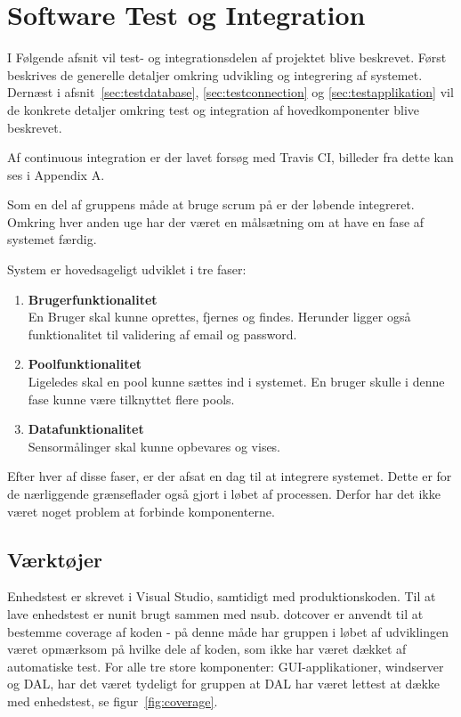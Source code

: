 \chapter{Software Test og Integration}

I Følgende afsnit vil test- og integrationsdelen af projektet blive beskrevet. Først beskrives de generelle detaljer omkring udvikling og integrering af systemet. 
Dernæst i afsnit~\ref{sec:testdatabase}, \ref{sec:testconnection} og \ref{sec:testapplikation} vil de konkrete detaljer omkring test og integration af hovedkomponenter blive beskrevet.

Af continuous integration er der lavet forsøg med Travis CI, billeder fra dette kan ses i Appendix A.

Som en del af gruppens måde at bruge scrum på er der løbende integreret. Omkring hver anden uge har der været en målsætning om at have en fase af systemet færdig. 

System er hovedsageligt udviklet i tre faser: 

\begin{enumerate}
	\item \textbf{Brugerfunktionalitet}\\
	En Bruger skal kunne oprettes, fjernes og findes. Herunder ligger også funktionalitet til validering af email og password. 
	\item \textbf{Poolfunktionalitet}\\
	Ligeledes skal en pool kunne sættes ind i systemet. En bruger skulle i denne fase kunne være tilknyttet flere pools.
	\item \textbf{Datafunktionalitet}\\
	Sensormålinger skal kunne opbevares og vises. 
\end{enumerate}

Efter hver af disse faser, er der afsat en dag til at integrere systemet. Dette er for de nærliggende grænseflader også gjort i løbet af processen. Derfor har det ikke været noget problem at forbinde komponenterne. 

\section{Værktøjer}
Enhedstest er skrevet i Visual Studio, samtidigt med produktionskoden. Til at lave enhedstest er \gls{nunit} brugt sammen med \gls{nsub}. 
\gls{dotcover} er anvendt til at bestemme coverage af koden - på denne måde har gruppen i løbet af udviklingen været opmærksom på hvilke dele af koden, som ikke har været dækket af automatiske test.
For alle tre store komponenter: GUI-applikationer, \gls{windserver} og DAL, har det været tydeligt for gruppen at DAL har været lettest at dække med enhedstest, se figur~\ref{fig:coverage}.

